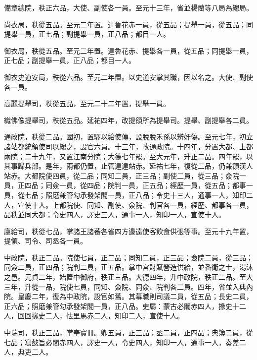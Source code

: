 \begin{pinyinscope}
 備章總院，秩正六品，大使、副使各一員。至元十三年，省並楊藺等八局為總局。



 尚衣局，秩從五品。至元二年置。達魯花赤一員，從五品；提舉一員，從五品；同提舉一員，正七品；副提舉一員，正八品；都目一人。



 御衣局，秩從五品。至元二年置。達魯花赤、提舉各一員，從五品；同提舉一員，正七品；副提舉一員，正八品；都目一人。



 御衣史道安局，秩從六品。至元二年置。以史道安掌其職，因以名之。大使、副使各一員。



 高麗提舉司，秩從五品，至元二十二年置，提舉一員。



 織佛像提舉司，秩從五品。延祐四年，改提領所為提舉司。提舉、副提舉各二員。



 通政院，秩從二品。國初，置驛以給使傳，設脫脫禾孫以辨奸偽。至元七年，初立諸站都統領使司以總之，設官六員。十三年，改通政院。十四年，分置大都、上都兩院；二十九年，又置江南分院；大德七年罷。至大元年，升正二品。四年罷，以其事歸兵部。是年，兩都仍置，止管達達站赤。延祐七年，復從二品，仍兼領漢人站赤。大都院使四員，從二品；同知二員，正三品；副使二員，從三品；僉院一員，正四品；同僉一員，從四品；院判一員，正五品；經歷一員，從五品；都事一員，從七品；照磨兼管勾承發架閣一員，正八品；令史十三人，通事一人，知印二人，宣使十人。上都院使、同知、副使、僉院、判官各一員，經歷、都事各一員，品秩並同大都；令史四人，譯史三人，通事一人，知印一人，宣使十人。



 廩給司，秩從七品，掌諸王諸蕃各省四方邊遠使客飲食供張等事。至元十九年置，提領、司令、司丞各一員。



 中政院，秩正二品。院使七員，正二品；同知二員，正三品；僉院二員，從三品；同僉二員，正四品；院判二員，正五品。掌中宮財賦營造供給，並番衛之士，湯沐之邑。元貞二年，始置中御府，秩正三品。大德四年，升中政院，秩正二品。至大三年，升從一品，院使七員，同知、僉院、同僉、院判各二員。四年，省並入典內院。皇慶二年，復為中政院，設官如舊。其幕職則司議二員，從五品；長史二員，正六品；照磨兼管勾承發架閣一員，正八品。吏屬：蒙古必闍赤四人，掾史十二人，回回掾史二人，怯里馬赤二人，知印二人，宣使十人。



 中瑞司，秩正三品，掌奉寶冊。卿五員，正三品；丞二員，正四品；典簿二員，從七品；寫懿旨必闍赤四人，譯史一人，令史四人，知印一人，通事一人，奏差二人，典吏二人。




\end{pinyinscope}
